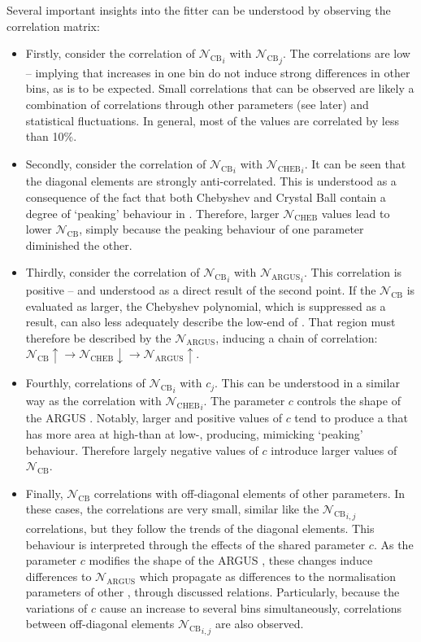 Several important insights into the fitter can be understood by observing the correlation matrix:
\begin{itemize}
\item
Firstly, consider the correlation of ${\mathcal{N}_{\mathrm{CB}}}_i$ with ${\mathcal{N}_{\mathrm{CB}}}_j$.
The correlations are low -- implying that increases in one bin do not induce strong differences in other bins, as is to be expected.
Small correlations that can be observed are likely a combination of correlations through other parameters (see later) and statistical fluctuations.
In general, most of the values are correlated by less than 10\%.
\item Secondly, consider the correlation of ${\mathcal{N}_{\mathrm{CB}}}_i$ with ${\mathcal{N}_{\mathrm{CHEB}}}_i$.
It can be seen that the diagonal elements are strongly anti-correlated.
This is understood as a consequence of the fact that both Chebyshev and Crystal Ball  contain a degree of `peaking' behaviour in \Mbc.
Therefore, larger $\mathcal{N}_{\mathrm{CHEB}}$ values lead to lower ${\mathcal{N}_{\mathrm{CB}}}$, simply because the peaking behaviour of one parameter diminished the other.
\item Thirdly, consider the correlation of ${\mathcal{N}_{\mathrm{CB}}}_i$ with ${\mathcal{N}_{\mathrm{ARGUS}}}_i$.
This correlation is positive -- and understood as a direct result of the second point.
If the $\mathcal{N}_{\mathrm{CB}}$ is evaluated as larger, the Chebyshev polynomial, which is suppressed as a result, can also less adequately describe the low-end of \Mbc.
That region must therefore be described by the $\mathcal{N}_{\mathrm{ARGUS}}$, inducing a chain of correlation: $\mathcal{N}_{\mathrm{CB}}\uparrow\rightarrow{\mathcal{N}_{\mathrm{CHEB}}}\downarrow\rightarrow\mathcal{N}_{\mathrm{ARGUS}}\uparrow$.
\item Fourthly, correlations of ${\mathcal{N}_{\mathrm{CB}}}_i$ with $c_j$.
This can be understood in a similar way as the correlation with ${\mathcal{N}_{\mathrm{CHEB}}}_i$.
The parameter $c$ controls the shape of the ARGUS .
Notably, larger and positive values of $c$ tend to produce a \PDF that has more area at high-\Mbc than at low-\Mbc, producing, mimicking `peaking' behaviour.
Therefore largely negative values of $c$ introduce larger values of $\mathcal{N}_{\mathrm{CB}}$.
\item Finally, $\mathcal{N}_{\mathrm{CB}}$ correlations with off-diagonal elements of other parameters.
In these cases, the correlations are very small, similar like the ${\mathcal{N}_{\mathrm{CB}}}_{i,j}$ correlations, but they follow the trends of the diagonal elements.
This behaviour is interpreted through the effects of the shared parameter $c$.
As the parameter $c$ modifies the shape of the ARGUS \PDF, these changes induce differences to $\mathcal{N}_{\mathrm{ARGUS}}$ which propagate as differences to the normalisation parameters of other , through discussed relations.
Particularly, because the variations of $c$ cause an increase to several bins simultaneously, correlations between off-diagonal elements ${\mathcal{N}_{\mathrm{CB}}}_{i,j}$ are also observed.
\end{itemize}

